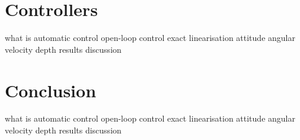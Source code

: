 \documentclass[11pt]{beamer}
\begin{document}
\section{Controllers}
\begin{frame}
what is automatic control
open-loop control
exact linearisation
attitude 
angular velocity
depth 
results
discussion
\end{frame}
\section{Conclusion}
\begin{frame}
what is automatic control
open-loop control
exact linearisation
attitude 
angular velocity
depth 
results
discussion
\end{frame}
\end{document}
